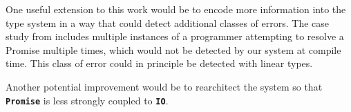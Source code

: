 \documentclass[12pt, english, letterpaper]{kuthesis}
\newcommand{\lit}[1]{\textbf{\texttt{#1}}}
\begin{document}
One useful extension to this work would be to encode more information into the type system in a way that could detect additional classes of errors.  The case study from \cite{madsen} includes multiple instances of a programmer attempting to resolve a \textsf{Promise} multiple times, which would not be detected by our system at compile time.  This class of error could in principle be detected with linear types.

Another potential improvement would be to rearchitect the system so that \lit{Promise} is less strongly coupled to \lit{IO}.





\appendix
\chapter{}
\end{document}
